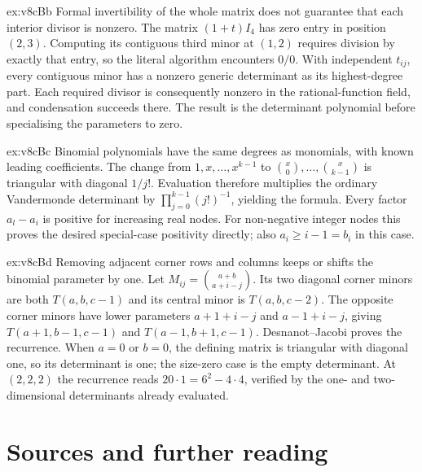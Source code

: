 \begin{solution}{ex:v8cBb}
\idea Formal invertibility of the whole matrix does not guarantee that each interior divisor is nonzero.
\writeup The matrix $(1+t)I_4$ has zero entry in position $(2,3)$. Computing its contiguous third minor at $(1,2)$ requires division by exactly that entry, so the literal algorithm encounters $0/0$. With independent $t_{ij}$, every contiguous minor has a nonzero generic determinant as its highest-degree part. Each required divisor is consequently nonzero in the rational-function field, and condensation succeeds there. The result is the determinant polynomial before specialising the parameters to zero.
\end{solution}
\begin{solution}{ex:v8cBc}
\idea Binomial polynomials have the same degrees as monomials, with known leading coefficients.
\writeup The change from $1,x,\ldots,x^{k-1}$ to $\binom{x}{0},\ldots,\binom{x}{k-1}$ is triangular with diagonal $1/j!$. Evaluation therefore multiplies the ordinary Vandermonde determinant by $\prod_{j=0}^{k-1}(j!)^{-1}$, yielding the formula. Every factor $a_l-a_i$ is positive for increasing real nodes. For non-negative integer nodes this proves the desired special-case positivity directly; also $a_i\ge i-1=b_i$ in this case.
\end{solution}
\begin{solution}{ex:v8cBd}
\idea Removing adjacent corner rows and columns keeps or shifts the binomial parameter by one.
\writeup Let $M_{ij}=\binom{a+b}{a+i-j}$. Its two diagonal corner minors are both $T(a,b,c-1)$ and its central minor is $T(a,b,c-2)$. The opposite corner minors have lower parameters $a+1+i-j$ and $a-1+i-j$, giving $T(a+1,b-1,c-1)$ and $T(a-1,b+1,c-1)$. Desnanot--Jacobi proves the recurrence. When $a=0$ or $b=0$, the defining matrix is triangular with diagonal one, so its determinant is one; the size-zero case is the empty determinant. At $(2,2,2)$ the recurrence reads $20\cdot1=6^2-4\cdot4$, verified by the one- and two-dimensional determinants already evaluated.
\end{solution}

\section*{Sources and further reading}

